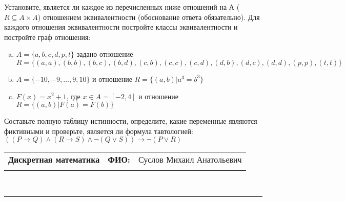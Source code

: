 \documentclass[10pt]{exam}
\newcommand{\class}{Дискретная математика}
\newcommand{\examdate}{}
\begin{document}
\begin{questions}
\question
Установите, является ли каждое из перечисленных ниже отношений на А ($R \subseteq A \times A$) отношением эквивалентности (обоснование ответа обязательно). Для каждого отношения эквивалентности постройте классы 
эквивалентности и постройте граф отношения:
\begin{enumerate} [a)]\setcounter{enumi}{0}
\item $A = \{a, b, c, d, p, t\}$ задано отношение $R = \{(a, a), (b, b), (b, c), (b, d), (c, b), (c, c), (c, d), (d, b), (d, c), (d, d), (p,p), (t,t)\}$
\item $A = \{-10, -9, … , 9, 10\}$ и отношение $R = \{(a,b)|a^{3} = b^{3}\}$

\item $F(x)=x^{2}+1$, где $x \in A = [-2, 4]$ и отношение $R = \{(a,b)|F(a) = F(b)\}$
\end{enumerate}\question Составьте полную таблицу истинности, определите, какие переменные являются фиктивными и проверьте, является ли формула тавтологией:
$((P \rightarrow Q) \land (R \rightarrow S) \land \neg (Q \lor S)) \rightarrow \neg (P \lor R)$

\end{questions}
\newpage
\begin{flushright}
\begin{tabular}{p{2.8in} r l}
\textbf{\class} & \textbf{ФИО:} &Суслов Михаил Анатольевич
\\

\textbf{\examdate} &&\\
\end{tabular}\\
\end{flushright}
\rule[1ex]{\textwidth}{.1pt}
\end{document}
